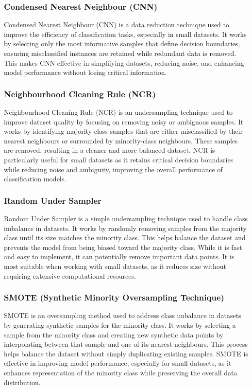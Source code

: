\subsubsection{Condensed Nearest Neighbour (CNN)}
Condensed Nearest Neighbour (CNN) is a data reduction technique used to improve the efficiency of classification tasks, especially in small datasets. It works by selecting only the most informative samples that define decision boundaries, ensuring misclassified instances are retained while redundant data is removed. This makes CNN effective in simplifying datasets, reducing noise, and enhancing model performance without losing critical information.

\subsubsection{Neighbourhood Cleaning Rule (NCR)}
Neighbourhood Cleaning Rule (NCR) is an undersampling technique used to improve dataset quality by focusing on removing noisy or ambiguous samples. It works by identifying majority-class samples that are either misclassified by their nearest neighbours or surrounded by minority-class neighbours. These samples are removed, resulting in a cleaner and more balanced dataset. NCR is particularly useful for small datasets as it retains critical decision boundaries while reducing noise and ambiguity, improving the overall performance of classification models.

\subsubsection{Random Under Sampler}
Random Under Sampler is a simple undersampling technique used to handle class imbalance in datasets. It works by randomly removing samples from the majority class until its size matches the minority class. This helps balance the dataset and prevents the model from being biased toward the majority class. While it is fast and easy to implement, it can potentially remove important data points. It is most suitable when working with small datasets, as it reduces size without requiring extensive computational resources.

\subsubsection{SMOTE (Synthetic Minority Oversampling Technique)}
SMOTE is an oversampling method used to address class imbalance in datasets by generating synthetic samples for the minority class. It works by selecting a sample from the minority class and creating new synthetic data points by interpolating between that sample and one of its nearest neighbours. This process helps balance the dataset without simply duplicating existing samples. SMOTE is effective in improving model performance, especially for small datasets, as it enhances representation of the minority class while preserving the overall data distribution.

